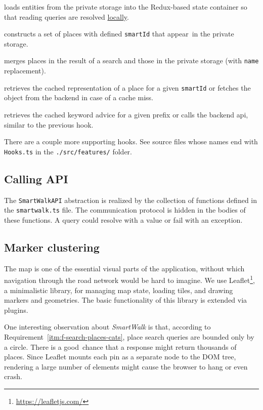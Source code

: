 \begin{description}[font=\tt]
\item[useFavorites] loads entities from the private storage into the Redux-based state container so that reading queries are resolved \underline{locally}.
\item[useStoredSmarts] constructs a set of places with defined \texttt{smartId} that appear~in the private storage.
\item[usePlaces] merges places in the result of a search and those in the private storage (with \texttt{name} replacement).
\item[useSmartPlace] retrieves the cached representation of a place for a given \texttt{smartId} or fetches the object from the backend in case of a cache miss.
\item[useKeywordAdvice] retrieves the cached keyword advice for a given prefix or calls the backend \acs{api}, similar to the previous hook.
\end{description}

There are a couple more supporting hooks. See source files whose names end with \texttt{Hooks.ts} in the \texttt{./src/features/} folder.

\subsection{Calling API}

The \texttt{SmartWalkAPI} abstraction is realized by the collection of functions defined in the \texttt{smartwalk.ts} file. The communication protocol is hidden in the bodies of these functions. A query could resolve with a value or fail with an exception.

\subsection{Marker clustering}

The map is one of the essential visual parts of the application, without which nav\-i\-ga\-tion through the road network would be hard to imagine. We use Leaflet\footnote{\href{https://leafletjs.com/}{https://leafletjs.com/}}, a minimalistic library, for managing map state, loading tiles, and drawing markers and geometries. The basic functionality of this library is extended via plugins.

One interesting observation about \emph{SmartWalk} is that, according to Requirement~\ref{itm:f-search-places-cats}, place search queries are bounded only by a circle. There is a good~chance that a response might return thousands of places. Since Leaflet mounts each pin as a separate node to the DOM tree, rendering a large number of elements might cause the browser to hang or even crash.

